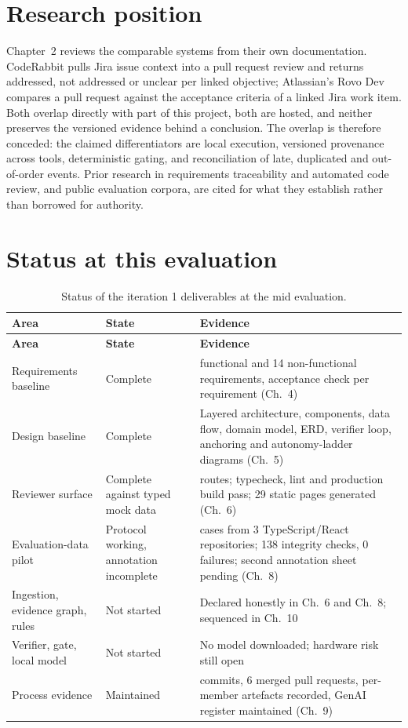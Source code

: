 \section*{Research position}

Chapter~2 reviews the comparable systems from their own documentation. CodeRabbit
pulls Jira issue context into a pull request review and returns addressed, not
addressed or unclear per linked objective; Atlassian's Rovo Dev compares a pull
request against the acceptance criteria of a linked Jira work item. Both overlap
directly with part of this project, both are hosted, and neither preserves the
versioned evidence behind a conclusion. The overlap is therefore conceded: the
claimed differentiators are local execution, versioned provenance across tools,
deterministic gating, and reconciliation of late, duplicated and out-of-order
events. Prior research in requirements traceability and automated code review,
and public evaluation corpora, are cited for what they establish rather than
borrowed for authority.

\section*{Status at this evaluation}

\begin{longtable}{>{\raggedright\arraybackslash}p{} >{\raggedright\arraybackslash}p{} >{\raggedright\arraybackslash}p{}}
\caption{Status of the iteration 1 deliverables at the mid evaluation.}\label{tab:exec-status}\\
\hline\textbf{Area} & \textbf{State} & \textbf{Evidence} \\
\hline\endfirsthead
\hline\textbf{Area} & \textbf{State} & \textbf{Evidence} \\
\hline\endhead
Requirements baseline & Complete & 29 functional and 14 non-functional
  requirements, acceptance check per requirement (Ch.~4) \\
Design baseline & Complete & Layered architecture, components, data flow,
  domain model, ERD, verifier loop, anchoring and autonomy-ladder diagrams
  (Ch.~5) \\
Reviewer surface & Complete against typed mock data & 19 routes; typecheck, lint
  and production build pass; 29 static pages generated (Ch.~6) \\
Evaluation-data pilot & Protocol working, annotation incomplete & 15 cases from
  3 TypeScript/React repositories; 138 integrity checks, 0 failures; second
  annotation sheet pending (Ch.~8) \\
Ingestion, evidence graph, rules & Not started & Declared honestly in Ch.~6 and
  Ch.~8; sequenced in Ch.~10 \\
Verifier, gate, local model & Not started & No model downloaded; hardware risk
  still open \\
Process evidence & Maintained & 65 commits, 6 merged pull requests, per-member
  artefacts recorded, GenAI register maintained (Ch.~9) \\
\hline\end{longtable}

